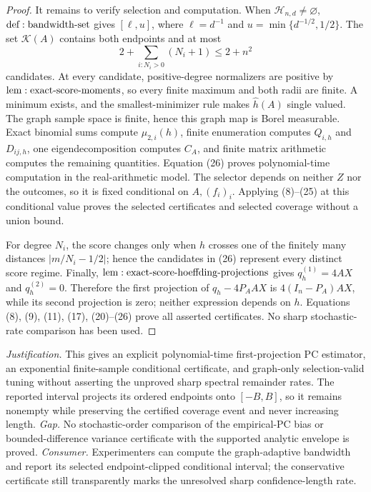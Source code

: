 \documentclass{article}
\begin{document}
\begin{proof}
It remains to verify selection and computation.  When \(\mathcal H_{n,d}\ne\varnothing\), \({\rm def:bandwidth\text{-}set}\) gives \([\ell,u]\), where \(\ell=d^{-1}\) and \(u=\min\{d^{-1/2},1/2\}\).  The set \(\mathcal K(A)\) contains both endpoints and at most
\[
 2+\sum_{i:N_i>0}(N_i+1)\leq2+n^2
\tag{26}
\]
candidates.  At every candidate, positive-degree normalizers are positive by \({\rm lem:exact\text{-}score\text{-}moments}\), so every finite maximum and both radii are finite.  A minimum exists, and the smallest-minimizer rule makes \(\widehat h(A)\) single valued.  The graph sample space is finite, hence this graph map is Borel measurable.  Exact binomial sums compute \(\mu_{2,i}(h)\), finite enumeration computes \(Q_{i,h}\) and \(D_{ij,h}\), one eigendecomposition computes \(C_A\), and finite matrix arithmetic computes the remaining quantities.  Equation (26) proves polynomial-time computation in the real-arithmetic model.  The selector depends on neither \(Z\) nor the outcomes, so it is fixed conditional on \(A,(f_i)_i\).  Applying (8)--(25) at this conditional value proves the selected certificates and selected coverage without a union bound.

For degree \(N_i\), the score changes only when \(h\) crosses one of the finitely many distances \(|m/N_i-1/2|\); hence the candidates in (26) represent every distinct score regime.  Finally, \({\rm lem:exact\text{-}score\text{-}hoeffding\text{-}projections}\) gives \(q_h^{(1)}=4AX\) and \(q_h^{(2)}=0\).  Therefore the first projection of \(q_h-4P_AAX\) is \(4(I_n-P_A)AX\), while its second projection is zero; neither expression depends on \(h\).  Equations (8), (9), (11), (17), (20)--(26) prove all asserted certificates.  No sharp stochastic-rate comparison has been used.
\end{proof}
\par\smallskip\noindent \textit{Justification.} This gives an explicit polynomial-time first-projection PC estimator, an exponential finite-sample conditional certificate, and graph-only selection-valid tuning without asserting the unproved sharp spectral remainder rates. The reported interval projects its ordered endpoints onto \([-B,B]\), so it remains nonempty while preserving the certified coverage event and never increasing length. \textit{Gap.} No stochastic-order comparison of the empirical-PC bias or bounded-difference variance certificate with the supported analytic envelope is proved. \textit{Consumer.} Experimenters can compute the graph-adaptive bandwidth and report its selected endpoint-clipped conditional interval; the conservative certificate still transparently marks the unresolved sharp confidence-length rate.
\end{document}
